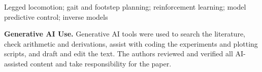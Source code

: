 \documentclass{l4dc2027}
\newif\ifrevmarkup
\newcommand{\verify}[1]{\ifrevmarkup\textcolor{magenta}{#1}\else#1\fi}
\begin{document}
\begin{keywords}%
  Legged locomotion; gait and footstep planning; reinforcement learning;
  model predictive control; inverse models%
\end{keywords}








\vspace{1.5em}
\par\smallskip\noindent\textbf{Generative AI Use.}
\verify{Generative AI tools were used to search the literature, check
arithmetic and derivations, assist with coding the
experiments and plotting scripts, and draft and edit the text. The authors
reviewed and verified all AI-assisted content and take responsibility for the paper.}




\appendix

\end{document}

